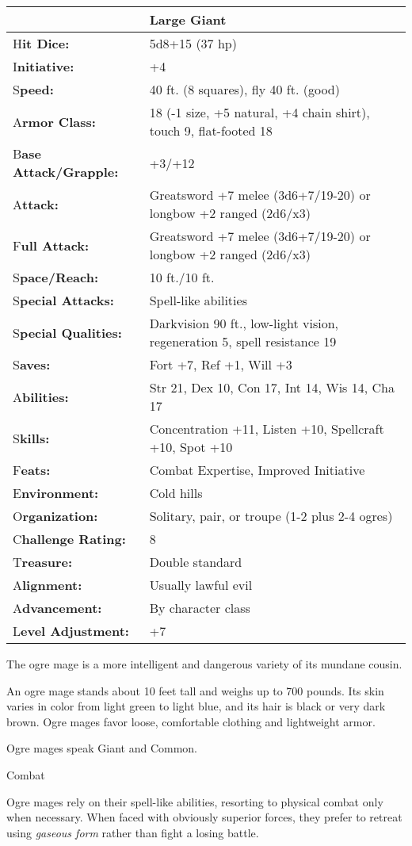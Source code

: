 \documentclass{article}
\begin{document}
\begin{tabular}{|>{\raggedright}p{81pt}|>{\raggedright}p{244pt}|}
\hline
  & Large Giant\tabularnewline
\hline
H\textbf{it Dice:} & 5d8+15 (37 hp)\tabularnewline
\hline
I\textbf{nitiative:} & +4\tabularnewline
\hline
S\textbf{peed:} & 40 ft. (8 squares), fly 40 ft. (good)\tabularnewline
\hline
A\textbf{rmor Class:} & 18 (-1 size, +5 natural, +4 chain shirt), touch 9, flat-footed 
18\tabularnewline
\hline
B\textbf{ase Attack/Grapple:} & +3/+12\tabularnewline
\hline
A\textbf{ttack:} & Greatsword +7 melee (3d6+7/19-20) or longbow +2 ranged (2d6/x3)\tabularnewline
\hline
F\textbf{ull Attack:} & Greatsword +7 melee (3d6+7/19-20) or longbow +2 ranged 
(2d6/x3)\tabularnewline
\hline
S\textbf{pace/Reach:} & 10 ft./10 ft.\tabularnewline
\hline
S\textbf{pecial Attacks:} & Spell-like abilities\tabularnewline
\hline
S\textbf{pecial Qualities:} & Darkvision 90 ft., low-light vision, regeneration 
5, spell resistance 19\tabularnewline
\hline
S\textbf{aves:} & Fort +7, Ref +1, Will +3\tabularnewline
\hline
A\textbf{bilities:} & Str 21, Dex 10, Con 17, Int 14, Wis 14, Cha 17\tabularnewline
\hline
S\textbf{kills:} & Concentration +11, Listen +10, Spellcraft +10, Spot +10 \tabularnewline
\hline
F\textbf{eats:} & Combat Expertise, Improved Initiative\tabularnewline
\hline
E\textbf{nvironment:} & Cold hills\tabularnewline
\hline
O\textbf{rganization:} & Solitary, pair, or troupe (1-2 plus 2-4 ogres)\tabularnewline
\hline
C\textbf{hallenge Rating:} & 8\tabularnewline
\hline
T\textbf{reasure:} & Double standard\tabularnewline
\hline
A\textbf{lignment:} & Usually lawful evil\tabularnewline
\hline
A\textbf{dvancement:} & By character class\tabularnewline
\hline
L\textbf{evel Adjustment:} & +7\tabularnewline
\hline
\end{tabular}

\vspace{12pt}
The ogre mage is a more intelligent and dangerous variety of its mundane cousin.

An ogre mage stands about 10 feet tall and weighs up to 700 pounds. Its skin varies 
in color from light green to light blue, and its hair is black or very dark brown. 
Ogre mages favor loose, comfortable clothing and lightweight armor.

Ogre mages speak Giant and Common.

Combat

Ogre mages rely on their spell-like abilities, resorting to physical combat only 
when necessary. When faced with obviously superior forces, they prefer to retreat 
using \textit{gaseous form }rather than fight a losing battle.
\end{document}
